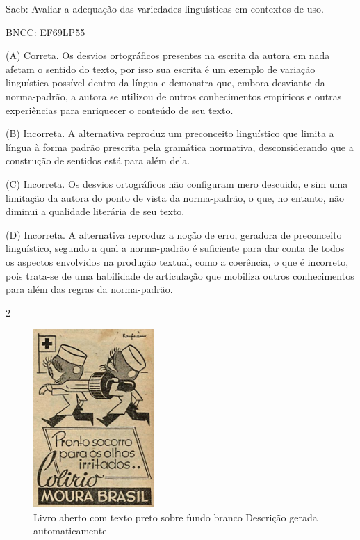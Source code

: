 Saeb: Avaliar a adequação das variedades linguísticas em contextos de
uso.

BNCC: EF69LP55

(A) Correta. Os desvios ortográficos presentes na escrita da autora em
nada afetam o sentido do texto, por isso sua escrita é um exemplo de
variação linguística possível dentro da língua e demonstra que, embora
desviante da norma-padrão, a autora se utilizou de outros conhecimentos
empíricos e outras experiências para enriquecer o conteúdo de seu texto.

(B) Incorreta. A alternativa reproduz um preconceito linguístico que
limita a língua à forma padrão prescrita pela gramática normativa,
desconsiderando que a construção de sentidos está para além dela.

(C) Incorreta. Os desvios ortográficos não configuram mero descuido, e
sim uma limitação da autora do ponto de vista da norma-padrão, o que, no
entanto, não diminui a qualidade literária de seu texto.

(D) Incorreta. A alternativa reproduz a noção de erro, geradora de
preconceito linguístico, segundo a qual a norma-padrão é suficiente para
dar conta de todos os aspectos envolvidos na produção textual, como a
coerência, o que é incorreto, pois trata-se de uma habilidade de
articulação que mobiliza outros conhecimentos para além das regras da
norma-padrão.

\num{2}

\begin{figure}
\centering
\includegraphics[width=1.81474in,height=2.66429in]{./imgSAEB_8_POR/media/image35.png}
\caption{Livro aberto com texto preto sobre fundo branco Descrição
gerada automaticamente}
\end{figure}


